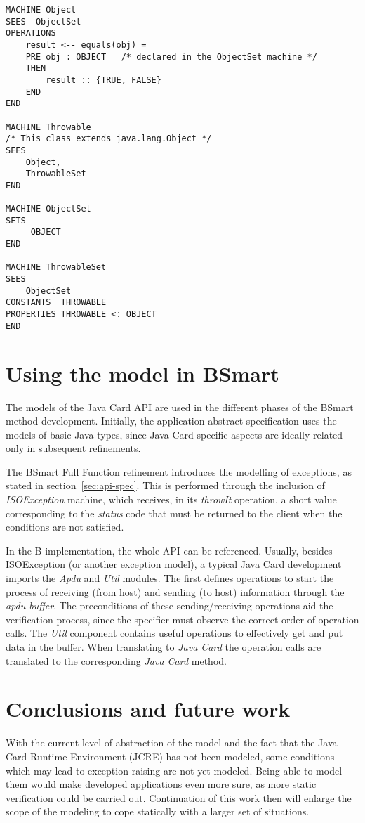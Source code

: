 \documentclass{entcs}
\begin{document}
\begin{lstlisting}
MACHINE Object
SEES  ObjectSet
OPERATIONS
 	result <-- equals(obj) =
	PRE obj : OBJECT   /* declared in the ObjectSet machine */
	THEN
		result :: {TRUE, FALSE}
	END
END

MACHINE Throwable
/* This class extends java.lang.Object */
SEES
    Object,
    ThrowableSet
END

MACHINE ObjectSet
SETS
     OBJECT   
END

MACHINE ThrowableSet
SEES 
    ObjectSet    
CONSTANTS  THROWABLE
PROPERTIES THROWABLE <: OBJECT
END
\end{lstlisting}



\section{Using the model in BSmart}

The models of the Java Card API are used in the different phases of the 
BSmart method development. Initially, the application 
abstract specification uses the models of basic Java types, 
since Java Card specific aspects are ideally related only
in subsequent refinements.

The BSmart Full Function refinement introduces the modelling of exceptions, 
as stated in section~\ref{sec:api-spec}. This is performed through  the inclusion
of \emph{ISOException} machine, which receives, in its \emph{throwIt} operation, 
a short value corresponding to the \emph{status} code that must be returned to 
the client when the conditions are not satisfied.  

In the B implementation, the whole API can be referenced. Usually,
besides ISOException (or another exception model), a typical Java Card
development imports the \emph{Apdu} and \emph{Util} modules. The first
defines operations to start the process of receiving (from host) and
sending (to host) information through the \emph{apdu buffer}. The
preconditions of these sending/receiving operations aid the
verification process, since the specifier must observe the correct
order of operation calls. The \emph{Util} component contains useful
operations to effectively get and put data in the buffer. When
translating to \emph{Java Card} the operation calls are translated
to the corresponding \emph{Java Card} method.

\section{Conclusions and future work}

With the current level of abstraction of the model and the fact that
the Java Card Runtime Environment (JCRE) has not been modeled, some
conditions which may lead to exception raising are not yet
modeled. Being able to model them would make developed applications
even more sure, as more static verification could be carried
out. Continuation of this work then will enlarge the scope of the
modeling to cope statically with a larger set of situations.




\end{document}
